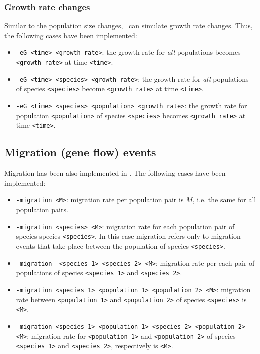 \subsubsection{Growth rate changes}
Similar to the population size changes, \comus\ can simulate growth rate changes. Thus, the following cases have been implemented:

\begin{itemize}
\item \verb!-eG <time> <growth rate>!: the growth rate for \emph{all} populations becomes \verb!<growth rate>! at time \verb!<time>!. 
\item \verb!-eG <time> <species> <growth rate>!: the growth rate for \emph{all} populations of species \verb!<species>! become \verb!<growth rate>! at time \verb!<time>!. 
\item \verb!-eG <time> <species> <population> <growth rate>!: the growth rate for population \verb!<population>! of species \verb!<species>! becomes \verb!<growth rate>! at time \verb!<time>!. 
\end{itemize}


\subsection{Migration (gene flow) events}
Migration has been also implemented in \comus. The following cases have been implemented:

\begin{itemize}
\item \verb!-migration <M>!: migration rate per population pair is $M$, i.e. the same for all population pairs.
\item \verb!-migration <species> <M>!: migration rate for each population pair of species species \verb!<species>!. In this case migration refers only to migration events that take place between the population of species \verb!<species>!.
\item \verb!-migration  <species 1> <species 2> <M>!: migration rate per each pair of populations of species \verb!<species 1>! and \verb!<species 2>!.
\item \verb!-migration <species 1> <population 1> <population 2> <M>!: migration rate between \verb!<population 1>! and \verb!<population 2>! of species \verb!<species>! is \verb!<M>!.
\item \verb!-migration <species 1> <population 1> <species 2> <population 2> <M>!: migration rate for \verb!<population 1>! and \verb!<population 2>! of species \verb!<species 1>! and \verb!<species 2>!, respectively is \verb!<M>!. 
\end{itemize}


